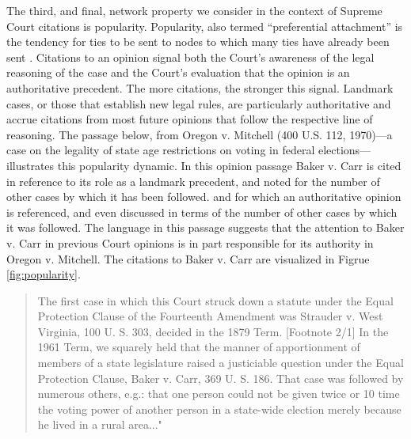 \documentclass{cup-pan}
\begin{document}
The third, and final, network property we consider in the context of Supreme Court citations is popularity. Popularity, also termed ``preferential attachment'' is the tendency for ties to be sent to nodes to which many ties have already been sent \citep{barabasi1999emergence}. Citations to an opinion signal both the Court's awareness of the legal reasoning of the case and the Court's evaluation that the opinion is an authoritative precedent. The more citations, the stronger this signal. Landmark cases, or those that establish new legal rules, are particularly authoritative and accrue citations from most future opinions that follow the respective line of reasoning. The passage below, from Oregon v. Mitchell (400 U.S. 112, 1970)---a case on the legality of state age restrictions on voting in federal elections---illustrates this popularity dynamic. In this opinion passage Baker v. Carr is cited in reference to its role as a landmark precedent, and noted for the number of other cases by which it has been followed. and for which an authoritative opinion is referenced, and even discussed in terms of the number of other cases by which it was followed. The language in this passage suggests that the attention to Baker v. Carr in previous Court opinions is in part responsible for its authority in Oregon v. Mitchell. The citations to Baker v. Carr are visualized in Figrue \ref{fig:popularity}.
\begin{quotation}
The first case in which this Court struck down a statute under the Equal Protection Clause of the Fourteenth Amendment was Strauder v. West Virginia, 100 U. S. 303, decided in the 1879 Term. [Footnote 2/1] In the 1961 Term, we squarely held that the manner of apportionment of members of a state legislature raised a justiciable question under the Equal Protection Clause, Baker v. Carr, 369 U. S. 186. That case was followed by numerous others, e.g.: that one person could not be given twice or 10 time the voting power of another person in a state-wide election merely because he lived in a rural area..."
\end{quotation} %
\end{document}
